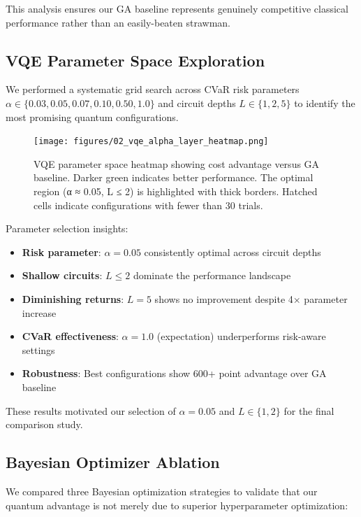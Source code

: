 This analysis ensures our GA baseline represents genuinely competitive classical performance rather than an easily-beaten strawman.

\subsection{VQE Parameter Space Exploration}
\label{sec:appendix_vqe_grid}

We performed a systematic grid search across CVaR risk parameters $\alpha \in \{0.03, 0.05, 0.07, 0.10, 0.50, 1.0\}$ and circuit depths $L \in \{1, 2, 5\}$ to identify the most promising quantum configurations.

\begin{figure}[h]
  \centering
  \texttt{[image: figures/02\_vqe\_alpha\_layer\_heatmap.png]}
  \caption{VQE parameter space heatmap showing cost advantage versus GA baseline. Darker green indicates better performance. The optimal region (α ≈ 0.05, L ≤ 2) is highlighted with thick borders. Hatched cells indicate configurations with fewer than 30 trials.}
  \label{fig:vqe_parameter_grid}
\end{figure}

Parameter selection insights:
\begin{itemize}
    \item \textbf{Risk parameter}: $\alpha = 0.05$ consistently optimal across circuit depths
    \item \textbf{Shallow circuits}: $L \leq 2$ dominate the performance landscape
    \item \textbf{Diminishing returns}: $L = 5$ shows no improvement despite 4× parameter increase
    \item \textbf{CVaR effectiveness}: $\alpha = 1.0$ (expectation) underperforms risk-aware settings
    \item \textbf{Robustness}: Best configurations show 600+ point advantage over GA baseline
\end{itemize}

These results motivated our selection of $\alpha = 0.05$ and $L \in \{1, 2\}$ for the final comparison study.

\subsection{Bayesian Optimizer Ablation}
\label{sec:appendix_optimizer_ablation}

We compared three Bayesian optimization strategies to validate that our quantum advantage is not merely due to superior hyperparameter optimization:

